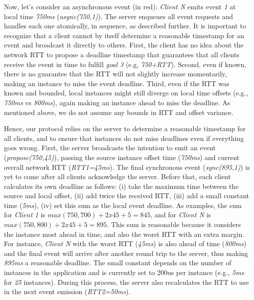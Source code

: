 \documentclass[sigplan,screen]{acmart}
\begin{document}
Now, let's consider an asynchronous event (in red): \emph{Client N} emits event
\emph{1} at local time \emph{750ms} (\emph{async(750,1)}).
The server enqueues all event requests and handles each one atomically, in
sequence, as described further.
%
It is important to recognize that a client cannot by itself determine a
reasonable timestamp for an event and broadcast it directly to others.
First, the client has no idea about the network RTT to propose a deadline
timestamp that guarantees that all clients receive the event in time to fulfill
\emph{goal 3} (e.g, \emph{750+RTT}).
Second, even if known, there is no guarantee that the RTT will not slightly
increase momentarily, making an instance to miss the event deadline.
Third, even if the RTT was known and bounded, local instances might still
diverge on local time offsets (e.g., \emph{750ms} vs \emph{800ms}), again
making an instance ahead to miss the deadline.
%
As mentioned above, we do not assume any bounds in RTT and offset variance.

Hence, our protocol relies on the server to determine a reasonable timestamp
for all clients, and to ensure that instances do not miss deadlines even if
everything goes wrong.
%
First, the server broadcasts the intention to emit an event
(\emph{propose(750,45)}), passing the source instance offset time
(\emph{750ms}) and current overall network RTT (\emph{RTT1=45ms}).
The final synchronous event (\emph{sync(895,1)}) is yet to come after all
clients acknowledge the server.
Before that, each client calculates its own deadline as follows:
    (i)   take the maximum time between the source and local offset,
    (ii)  add twice the received RTT,
    (iii) add a small constant time (\emph{5ms}),
    (iv)  set this sum as the local event deadline.
As examples, the sum for
    \emph{Client 1} is $max(750,700)+2x45+5=845$, and for
    \emph{Client N} is $max(750,800)+2x45+5=895$.
%
This sum is reasonable because it considers
    the instance most ahead in time, and also
    the worst RTT with an extra margin.
For instance, \emph{Client N} with the worst RTT (\emph{45ms}) is also ahead of
time (\emph{800ms}) and the final event will arrive after another round trip to
the server, thus making \emph{895ms} a reasonable deadline.
%
The small constant depends on the number of instances in the application and is
currently set to 200us per instance (e.g., \emph{5ms} for \emph{25} instances).
%
During this process, the server also recalculates the RTT to use in the next
event emission (\emph{RTT2=50ms}).
\end{document}
